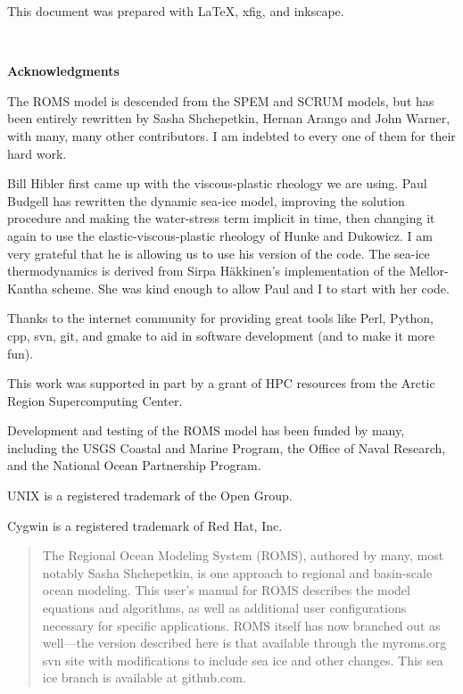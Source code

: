 \setcounter{page}{0}
This document was prepared with \LaTeX , xfig, and inkscape.

\mbox{  }
\begin{center}
\bf \LARGE Acknowledgments
\end{center}

The ROMS model is descended from the SPEM and SCRUM models, but has
been entirely rewritten by Sasha Shchepetkin, Hernan Arango and John
Warner, with many, many other contributors. I am indebted to every one
of them for their hard work.

Bill Hibler first came up with the viscous-plastic rheology we are
using. Paul Budgell has rewritten the dynamic sea-ice model, improving
the solution procedure and making the water-stress term implicit in time,
then changing it again to use the elastic-viscous-plastic rheology of
Hunke and Dukowicz. I am very grateful that he is allowing us to use
his version of the code. The sea-ice thermodynamics is derived from
Sirpa H\"akkinen's implementation of the Mellor-Kantha scheme. She was
kind enough to allow Paul and I to start with her code.

Thanks to the internet community for providing great tools like Perl,
Python, cpp, svn, git, and gmake to aid in software development (and to make
it more fun).

This work was supported in part by a grant of HPC resources from the
Arctic Region Supercomputing Center.

Development and testing of the ROMS model has been funded by many,
including the USGS Coastal and Marine Program, the Office of Naval
Research, and the National Ocean Partnership Program.

\vspace{\fill}
UNIX is a registered trademark of the Open Group.

Cygwin is a registered trademark of Red Hat, Inc.


\vfil\break
\begin{abstract}
The Regional Ocean Modeling System (ROMS), authored by many, most
notably Sasha Shchepetkin, is one approach to regional and basin-scale ocean
modeling. This user's manual for ROMS describes the model equations
and algorithms, as well as additional user configurations necessary
for specific applications. ROMS itself has now branched out as
well---the version described here is that available through the
myroms.org svn site with modifications to include sea ice and other
changes. This sea ice branch is available at github.com.

\end{abstract}
